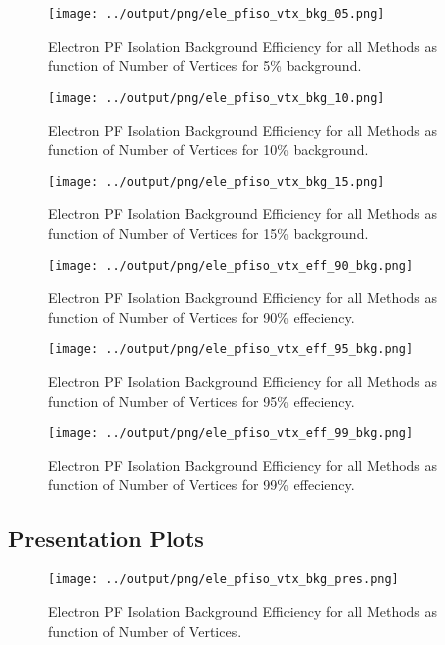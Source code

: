 \documentclass[11pt]{book}
\begin{document}
\begin{figure}[htb]
\centering
\texttt{[image: ../output/png/ele\_pfiso\_vtx\_bkg\_05.png]}
\caption{Electron PF Isolation Background Efficiency for all Methods as function of Number of Vertices for 5\% background.}
\label{fig:ele_pfiso_vtx_bkg_05}
\end{figure}

\begin{figure}[htb]
\centering
\texttt{[image: ../output/png/ele\_pfiso\_vtx\_bkg\_10.png]}
\caption{Electron PF Isolation Background Efficiency for all Methods as function of Number of Vertices for 10\% background.}
\label{fig:ele_pfiso_vtx_bkg_10}
\end{figure}

\begin{figure}[htb]
\centering
\texttt{[image: ../output/png/ele\_pfiso\_vtx\_bkg\_15.png]}
\caption{Electron PF Isolation Background Efficiency for all Methods as function of Number of Vertices for 15\% background.}
\label{fig:ele_pfiso_vtx_bkg_15}
\end{figure}

\begin{figure}[htb]
\centering
\texttt{[image: ../output/png/ele\_pfiso\_vtx\_eff\_90\_bkg.png]}
\caption{Electron PF Isolation Background Efficiency for all Methods as function of Number of Vertices for 90\% effeciency.}
\label{fig:ele_pfiso_vtx_eff_90_bkg}
\end{figure}

\begin{figure}[htb]
\centering
\texttt{[image: ../output/png/ele\_pfiso\_vtx\_eff\_95\_bkg.png]}
\caption{Electron PF Isolation Background Efficiency for all Methods as function of Number of Vertices for 95\% effeciency.}
\label{fig:ele_pfiso_vtx_eff_95_bkg}
\end{figure}

\begin{figure}[htb]
\centering
\texttt{[image: ../output/png/ele\_pfiso\_vtx\_eff\_99\_bkg.png]}
\caption{Electron PF Isolation Background Efficiency for all Methods as function of Number of Vertices for 99\% effeciency.}
\label{fig:ele_pfiso_vtx_eff_99_bkg}
\end{figure}
\clearpage

\subsection{Presentation Plots}
\begin{figure}[htb]
\centering
\texttt{[image: ../output/png/ele\_pfiso\_vtx\_bkg\_pres.png]}
\caption{Electron PF Isolation Background Efficiency for all Methods as function of Number of Vertices.}
\label{fig:ele_pfiso_vtx_bkg_pres}
\end{figure}
\end{document}
